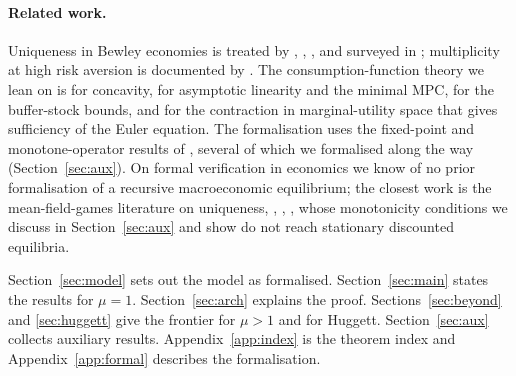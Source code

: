 \paragraph{Related work.}
Uniqueness in Bewley economies is treated by \citet{Acikgoz2018}, \citet{Light2020},
\citet{Light2022}, and surveyed in \citet{TodaWalsh2024}; multiplicity at high risk aversion is
documented by \citet{YoungWalsh2025}. The consumption-function theory we lean on is
\citet{CarrollKimball1996} for concavity, \citet{MaToda2022} for asymptotic linearity and the
minimal MPC, \citet{CarrollShanker2026} for the buffer-stock bounds, and \citet{LiStachurski2014}
for the contraction in marginal-utility space that gives sufficiency of the Euler equation.
The formalisation uses the fixed-point
and monotone-operator results of \citet{SargentStachurski2024}, several of which we formalised
along the way (Section~\ref{sec:aux}). On formal verification in economics we know of no prior
formalisation of a recursive macroeconomic equilibrium; the closest work is the mean-field-games
literature on uniqueness, \citet{LasryLions2007}, \citet{GraberMatter2024},
\citet{CannarsaCapuani2018}, whose monotonicity conditions we discuss in Section~\ref{sec:aux}
and show do not reach stationary discounted equilibria.

Section~\ref{sec:model} sets out the model as formalised. Section~\ref{sec:main} states the
results for $\mu=1$. Section~\ref{sec:arch} explains the proof. Sections~\ref{sec:beyond} and
\ref{sec:huggett} give the frontier for $\mu>1$ and for Huggett. Section~\ref{sec:aux} collects
auxiliary results. Appendix~\ref{app:index} is the theorem index and Appendix~\ref{app:formal}
describes the formalisation.
